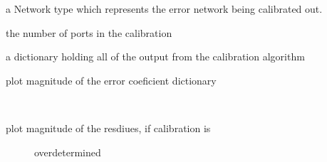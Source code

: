 \documentclass[letterpaper,10pt,english]{sphinxmanual}
\begin{document}
\begin{fulllineitems}
\begin{fulllineitems}
\begin{description}
\end{description}

\end{fulllineitems}


\begin{fulllineitems}
\label{auto_calibration:mwavepy.Calibration.error_ntwk}
a Network type which represents the error network being
calibrated out.

\end{fulllineitems}


\begin{fulllineitems}
\label{auto_calibration:mwavepy.Calibration.frequency}
\end{fulllineitems}


\begin{fulllineitems}
\label{auto_calibration:mwavepy.Calibration.nports}
the number of ports in the calibration

\end{fulllineitems}


\begin{fulllineitems}
\label{auto_calibration:mwavepy.Calibration.output_from_cal}
a dictionary holding all of the output from the calibration
algorithm

\end{fulllineitems}


\begin{fulllineitems}
\label{auto_calibration:mwavepy.Calibration.plot_coefs_db}
plot magnitude of the error coeficient dictionary

\end{fulllineitems}


\begin{fulllineitems}
\label{auto_calibration:mwavepy.Calibration.plot_residuals_db}~\begin{description}
\item[{plot magnitude of the resdiues, if calibration is}] \leavevmode
overdetermined


\end{description}
\end{fulllineitems}
\end{fulllineitems}
\end{document}

